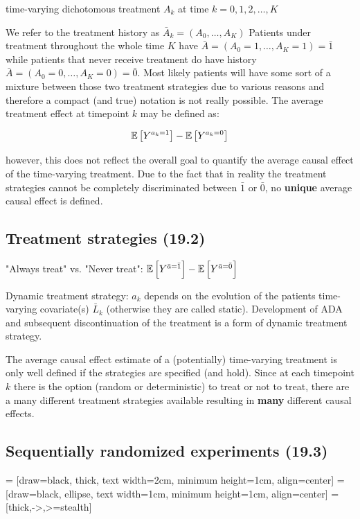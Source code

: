 \documentclass[11pt,a4paper,twoside]{book}\usepackage[]{graphicx}\usepackage[]{xcolor}
\begin{document}
time-varying dichotomous treatment $A_k$ at time $k=0,1,2,\dots,K$

We refer to the treatment history as $\bar{A}_k=\left(A_0,\dots, A_K\right)$
Patients under treatment throughout the whole time $K$ have $\bar{A}=\left(A_0=1,\dots, A_K=1\right)=\bar{1}$ while patients that never receive treatment do have history $\bar{A}=\left(A_0=0,\dots, A_K=0\right)=\bar{0}$.
Most likely patients will have some sort of a mixture between those two treatment strategies due to various reasons and therefore a compact (and true) notation is not really possible.
The average treatment effect at timepoint $k$ may be defined as:

$$\operatorname{\mathbb{E}}\left[Y^{a_k=1}\right]-\operatorname{\mathbb{E}}\left[Y^{a_k=0}\right]$$

however, this does not reflect the overall goal to quantify the average causal effect of the time-varying treatment.
Due to the fact that in reality the treatment strategies cannot be completely discriminated between $\bar{1}$ or $\bar{0}$, no \textbf{unique} average causal effect is defined.

\subsection{Treatment strategies (19.2)}

"Always treat" vs. "Never treat": $\operatorname{\mathbb{E}}\left[Y^{\bar{a}=\bar{1}}\right]-\operatorname{\mathbb{E}}\left[Y^{\bar{a}=\bar{0}}\right]$

Dynamic treatment strategy: $a_k$ depends on the evolution of the patients time-varying covariate(s) $\bar{L}_k$ (otherwise they are called static). Development of ADA and subsequent discontinuation of the treatment is a form of dynamic treatment strategy.


The average causal effect estimate of a (potentially) time-varying treatment is only well defined if the strategies are specified (and hold). Since at each timepoint $k$ there is the option (random or deterministic) to treat or not to treat, there are a many different treatment strategies available resulting in \textbf{many} different causal effects. 

\subsection{Sequentially randomized experiments (19.3)}

{} = [draw=black, thick, text width=2cm, minimum height=1cm, align=center]
 = [draw=black, ellipse, text width=1cm, minimum height=1cm, align=center] 
 = [thick,->,>=stealth]
\end{document}
